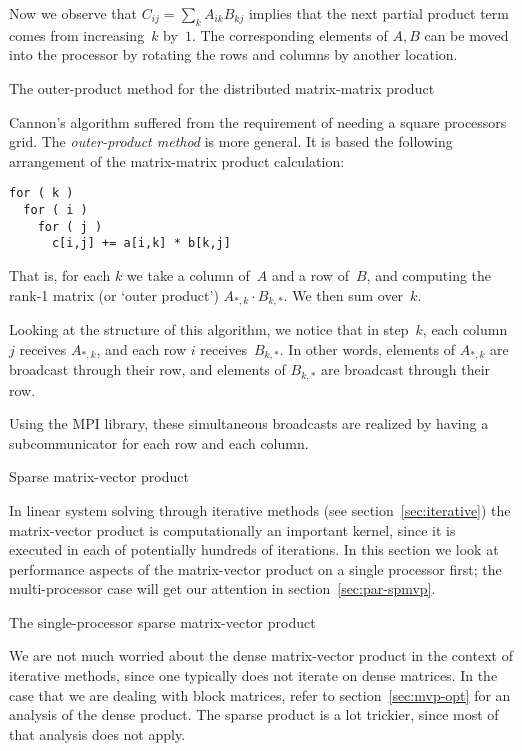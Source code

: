 Now we observe that $C_{ij}=\sum_kA_{ik}B_{kj}$ implies that
the next partial product term comes from increasing~$k$ by~$1$.
The corresponding elements of $A,B$ can be moved into the processor
by rotating the rows and columns by another location.

 {The outer-product method for the distributed matrix-matrix
  product}

Cannon's algorithm suffered from the requirement of needing a square
processors grid.
%
The \emph{outer-product method}%
is more general. It is based the following arrangement of the
matrix-matrix product calculation:
\begin{verbatim}
for ( k ) 
  for ( i )
    for ( j )
      c[i,j] += a[i,k] * b[k,j]
\end{verbatim}
That is, for each $k$ we take a column of~$A$ and a row of~$B$, and computing the
rank-1 matrix (or `outer product') $A_{*,k}\cdot B_{k,*}$. We then sum
over~$k$.

Looking at the structure of this algorithm, we notice that in
step~$k$, each column $j$ receives $A_{*,k}$, and each row $i$
receives~$B_{k,*}$. In other words, elements of $A_{*,k}$ are
broadcast through their row, and elements of $B_{k,*}$ are broadcast
through their row.

Using the MPI library, these simultaneous broadcasts are realized by
having a subcommunicator for each row and each column.


 {Sparse matrix-vector product}
\label{sec:pspmvp}

In linear system solving through iterative methods (see
section~\ref{sec:iterative}) the matrix-vector product is
computationally an important kernel, since it is executed in each of
potentially hundreds of iterations. In this section we look at
performance aspects of the matrix-vector product on a single
processor first; the multi-processor case will get our attention in
section~\ref{sec:par-spmvp}.

 {The single-processor sparse matrix-vector product}
\label{sec:spmvp-performance}

We are not much worried about the dense matrix-vector product in the
context of iterative methods, since one typically does not iterate on
dense matrices. In the case that we are dealing with block matrices,
refer to section~\ref{sec:mvp-opt} for an analysis of the dense
product. The sparse product is a lot trickier, since most of that
analysis does not apply.

